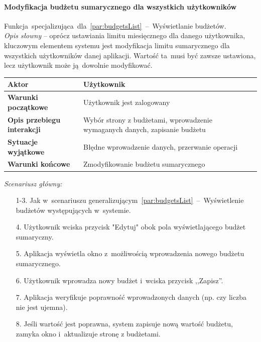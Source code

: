 \paragraph{Modyfikacja budżetu sumarycznego dla wszystkich użytkowników\newline}
\label{par:usersBudget}
Funkcja~specjalizująca~dla~\ref{par:budgetsList}~--~Wyświetlanie budżetów.\\

\textit{Opis słowny} -- oprócz ustawiania limitu miesięcznego dla danego użytkownika, kluczowym elementem systemu jest modyfikacja limitu sumarycznego dla wszystkich użytkowników danej aplikacji. Wartość ta~musi być zawsze ustawiona, lecz użytkownik może ją~dowolnie modyfikować.

\begin{longtable}{|p{5cm}|p{7cm}|}
  \hline \textbf{Aktor} & Użytkownik \\
  \hline \textbf{Warunki początkowe} & Użytkownik jest zalogowany \\
  \hline \textbf{Opis przebiegu interakcji} & Wybór strony z budżetami, wprowadzenie wymaganych danych, zapisanie budżetu \\
  \hline \textbf{Sytuacje wyjątkowe} & Błędne wprowadzenie danych, przerwanie operacji \\
  \hline \textbf{Warunki końcowe} & Zmodyfikowanie budżetu sumarycznego \\
  \hline
\end{longtable}

\noindent \textit{Scenariusz główny:}
\begin{enumerate}
  \item[1-3.] Jak w~scenariuszu generalizującym~\ref{par:budgetsList}~--~Wyświetlenie budżetów występujących w~systemie.
  \item[4.] Użytkownik wciska przycisk "Edytuj" obok pola wyświetlającego budżet sumaryczny.
  \item[5.] Aplikacja wyświetla okno z~możliwością wprowadzenia nowego budżetu sumarycznego.
  \item[6.] Użytkownik wprowadza nowy budżet i~wciska przycisk ,,Zapisz''.
  \item[7.] Aplikacja weryfikuje poprawność wprowadzonych danych (np. czy liczba nie jest ujemna).
  \item[8.] Jeśli wartość jest poprawna, system zapisuje nową wartość budżetu, zamyka okno i~aktualizuje stronę z budżetami.
\end{enumerate}

